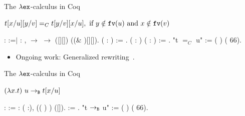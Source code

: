 \documentclass[10pt]{beamer}
\newcommand{\fv}[1]{{\tt fv}(#1)}
\begin{document}
\begin{frame}[fragile]{The $\lambda{\tt ex}$-calculus in Coq}
  \begin{center}
    $t[x/u][y/v] =_C t[y/v][x/u], \mbox{ if } y \notin\fv{u} \mbox{ and } x \notin \fv{v}$
    \end{center}
  
  \begin{coqdoccode}
      : 
     :=\coqdoceol \coqdocnoindent \ensuremath{|}
    : \coqdockw{\ensuremath{\forall}}
      , 
     \ensuremath{\rightarrow} 
     \ensuremath{\rightarrow} 
    ([][]) ((\&
    )[][]).\coqdoceol\coqdoceol
    \coqdocnoindent {} 
    ( : ) :=
      
    .\coqdoceol \coqdoceol
      ( :
    ) ( : ) :=
      
    .\coqdoceol \coqdocnoindent {} "t $=_C$
    u" := (  )
    (  66).\coqdoceol
  \end{coqdoccode}

  \begin{itemize}
  \item Ongoing work: Generalized rewriting~\cite{Sozeau09}.
  \end{itemize}
\end{frame}

\begin{frame}[fragile]{The $\lambda{\tt ex}$-calculus in Coq}
  \begin{center}
    $(\lambda x. t)\ u \to_{\tt B}  t[x/u]$     
  \end{center}
  \begin{coqdoccode}
      : 
     :=\coqdoceol \coqdocindent{1.50em}
     : \coqdockw{\ensuremath{\forall}}
    ( :), \coqdoceol
    \coqdocindent{2.50em} 
    (( )
    ) ([]).\coqdoceol
    \coqdoceol {}  
     := 
      .\coqdoceol
    \coqdocnoindent {} "t $\to_{\tt B}$ u" :=
    (  ) (
     66).\coqdoceol
  \end{coqdoccode}
\end{frame}
\end{document}
